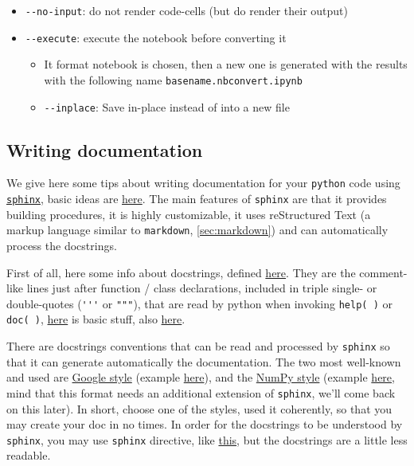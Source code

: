 \documentclass[a4paper,12pt,%
              final%
              ]{article}
\begin{document}
\begin{itemize}
\begin{itemize}
      \item \verb|--no-input|: do not render code-cells (but do render their output)
      \item \verb|--execute|: execute the notebook before converting it
        \begin{itemize}
          \item It format notebook is chosen, then a new one is generated with the results with the following name \texttt{basename.nbconvert.ipynb}
          \item \verb|--inplace|: Save in-place instead of into a new file
        \end{itemize}
    \end{itemize}
\end{itemize}

\subsection{Writing documentation}
We give here some tips about writing documentation for your \texttt{python} code using \href{https://www.sphinx-doc.org/en/master/index.html}{\texttt{sphinx}}, basic ideas are \href{https://docs.python-guide.org/writing/documentation/}{here}. The main features of \texttt{sphinx} are that it provides building procedures, it is highly customizable, it uses reStructured Text (a markup language similar to \texttt{markdown}, \autoref{sec:markdown}) and can automatically process the docstrings.

First of all, here some info about docstrings, defined \href{https://www.python.org/dev/peps/pep-0257/}{here}. They are the comment-like lines just after function / class declarations, included in triple single- or double-quotes (\verb|'''| or \verb|"""|), that are read by python when invoking \texttt{help( )} or \texttt{doc( )}, \href{https://www.geeksforgeeks.org/python-docstrings/}{here} is basic stuff, also \href{https://www.programiz.com/python-programming/docstrings}{here}.

There are docstrings conventions that can be read and processed by \texttt{sphinx} so that it can generate automatically the documentation. The two most well-known and used are \href{https://www.programiz.com/python-programming/docstrings}{Google style} (example \href{https://sphinxcontrib-napoleon.readthedocs.io/en/latest/example_google.html}{here}), and the \href{https://numpydoc.readthedocs.io/en/latest/format.html}{NumPy style} (example \href{https://sphinxcontrib-napoleon.readthedocs.io/en/latest/example_numpy.html#example-numpy}{here}, mind that this format needs an additional extension of \texttt{sphinx}, we'll come back on this later). In short, choose one of the styles, used it coherently, so that you may create your doc in no times. In order for the docstrings to be understood by \texttt{sphinx}, you may use \texttt{sphinx} directive, like \href{https://sphinx-rtd-tutorial.readthedocs.io/en/latest/docstrings.html#an-example-class-with-docstrings}{this}, but the docstrings are a little less readable.
\end{document}
